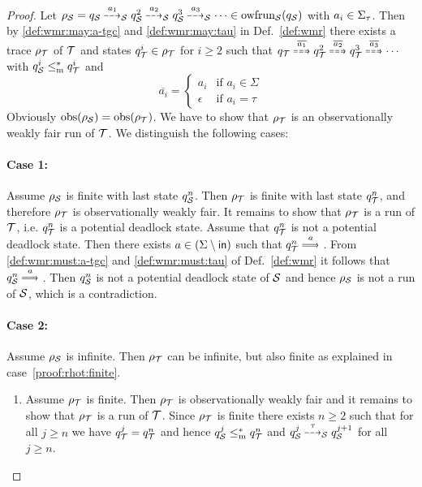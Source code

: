 \begin{proof}
    Let $\rho_\S = q_\S \may{a_1}_\S q^2_\S \may{a_2}_\S q^3_\S \may{a_3}_\S \cdots \in \wfrun{\S}(q_\S)$ with $a_i \in \Sigmat$. Then by \ref{def:wmr:may:a-tgc} and \ref{def:wmr:may:tau} in Def.~\ref{def:wmr} there exists a trace $\rho_\T$ of $\T$ and states $q^i_\T \in \rho_\T$ for $i \geq 2$ such that $q_\T \mayw{\overline{a_1}} q^2_\T \mayw{\overline{a_2}} q^3_\T \mayw{\overline{a_3}} \cdots$ with $q^i_\S \mrw q^i_\T$ and 
    \[
        \overline{a_i} = \begin{cases}
                        a_i &\text{if } a_i \in \Sigma\\ 
                        \epsilon &\text{if } a_i = \tau
                    \end{cases}
    \]
        Obviously $\obsa(\rho_\S) = \obsa(\rho_\T)$. We have to show that $\rho_\T$ is an observationally weakly fair run of $\T$. We distinguish the following cases:

        \paragraph{Case 1:} Assume $\rho_\S$ is finite with last state $q^n_\S$. Then $\rho_\T$ is finite with last state $q^n_\T$, and therefore $ \rho_\T$ is observationally weakly fair.
        It remains to show that $\rho_\T$ is a run of $\T$, i.e. $q^n_\T$ is a potential deadlock state. Assume that $q^n_\T$ is not a potential deadlock state. Then there exists $a \in (\Sigma \setminus \inset)$ such that $q^n_\T \mustw{a} \stateTGC$. From \ref{def:wmr:must:a-tgc} and \ref{def:wmr:must:tau} of Def.~\ref{def:wmr} it follows that $q^n_\S \mustw{a} \stateTGC$. Then $q^n_\S$ is not a potential deadlock state of $\S$ and hence $\rho_\S$ is not a run of $\S$, which is a contradiction.

        \paragraph{Case 2:} Assume $\rho_\S$ is infinite. 
        Then $\rho_\T$ can be infinite, but also finite as explained in case~\ref{proof:rhot:finite}.
        \begin{enumerate}[label=2.\arabic*:, ref=(2.\arabic*), leftmargin=*,start=1]
            \item\label{proof:rhot:finite} Assume $\rho_\T$ is finite. Then $\rho_\T$ is observationally weakly fair and it remains to show that $\rho_\T$ is a run of $\T$.
            Since $\rho_\T$ is finite there exists $n \geq 2$ such that for all $j \geq n$ we have $q^j_\T = q^n_\T$ and hence $q^j_\S \mrw q^n_\T$ and $q^j_\S \may{\tau}_\S q^{j+1}_\S$ for all $j \geq n$.
            

\end{enumerate}
\end{proof}
